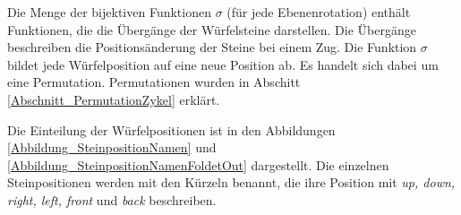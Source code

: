 \documentclass[12pt,a4paper, usenames, dvipsnames]{article}
\theoremstyle{mystyle}
\theoremstyle{definition}
\begin{document}
\label{Abschnitt_PositionenDerSteineImWürfel}

Die Menge der bijektiven Funktionen $\sigma$ (für jede Ebenenrotation) enthält Funktionen, die die Übergänge der Würfelsteine darstellen. Die Übergänge beschreiben die Positions\-änderung der Steine bei einem Zug. Die Funktion $\sigma$ bildet jede Würfelposition auf eine neue Position ab. Es handelt sich dabei um eine Permutation. Permutationen wurden in Abschitt \ref{Abschnitt_PermutationZykel} erklärt. 

Die Einteilung der Würfelpositionen ist in den Abbildungen \ref{Abbildung_SteinpositionNamen} und \ref{Abbildung_SteinpositionNamenFoldetOut} dargestellt. Die einzelnen Steinpositionen werden mit den Kürzeln benannt, die ihre Position mit \textit{up, down, right, left, front} und \textit{back} beschreiben.
\end{document}
